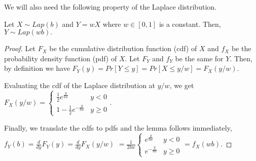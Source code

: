 We will also need the following property of the Laplace distribution. 
\begin{lem} \label{wtimeslap}
Let $X \sim Lap(b)$ and $Y = wX$ where $w \in [0,1]$ is a constant. Then, 
$Y \sim Lap(wb).$
\end{lem}
\begin{proof}
Let $F_X$ be the cumulative distribution function (cdf) of $X$ and $f_X$ be the probability density function (pdf) of $X$. Let $F_Y$ and $f_Y$ be the same for $Y$. Then, by definition we have 
$F_Y(y) = Pr[Y \leq y] = Pr[X \leq y/w] = F_X(y/w).$
	
Evaluating the cdf of the Laplace distribution at $y/w$, we get 
$F_X(y/w) = 
	\begin{cases} 
      \frac{1}{2}e^{\frac{y}{bw}} & y < 0 \\
      1 - \frac{1}{2}e^{-\frac{y}{bw}} & y \geq 0 
	\end{cases} .$
	
Finally, we translate the cdfs to pdfs and the lemma follows immediately, \\
$f_Y(b) = \frac{d}{dy}F_Y(y) = \frac{d}{dy}F_X(y/w) $
$= \frac{1}{2bw}
	\begin{cases} 
      e^{\frac{y}{bw}} & y < 0 \\
      e^{-\frac{y}{bw}} & y \geq 0 
	\end{cases}
     = f_X(wb).$
\end{proof}
